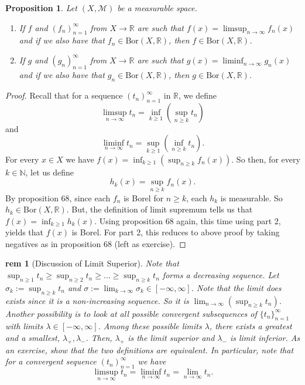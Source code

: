 \documentclass[letterpaper, 12pt]{article}
\newcommand{\fin}{\qquad \quad \hfill \framebox[1.75mm][l]{\,}}
\newcommand{\cM}{\mathcal{M}}
\newcommand{\bR}{\mathbb{R}}
\newcommand{\bN}{\mathbb{N}}
\theoremstyle{stdthm}
\newtheorem{prop}[thm]{Proposition}
\theoremstyle{stddef}
\newtheorem{rem}[thm]{rem} %
\theoremstyle{stdnonum}
\theoremstyle{stdqands}
\theoremstyle{stdbold}
\begin{document}
\begin{prop}
Let $(X,\cM)$ be a measurable space. 
\begin{enumerate}
\item If $f$ and $(f_n)_{n=1}^\infty$ from $X\to \bR$ are such that $f(x) = \limsup_{n\rightarrow \infty} f_n(x)$ and if we also have that $f_n \in \mathrm{Bor}(X,\bR)$, then $f\in\mathrm{Bor}(X,\bR)$. 
\item If $g$ and $(g_n)_{n=1}^\infty$ from $X \to \bR$ are such that $g(x) = \liminf_{n\rightarrow \infty} g_n(x)$ and if we also have that $g_n \in \mathrm{Bor}(X,\bR)$, then $g \in \mathrm{Bor}(X,\bR)$. 
\end{enumerate}
\end{prop}

\begin{proof}
Recall that for a sequence $(t_n)_{n=1}^\infty$ in $\bR$, we define 
\[
\limsup_{n\to \infty} t_n = \inf_{k\geq 1}\left(\sup_{n \geq k} t_n\right)
\]
and 
\[
\liminf_{n\rightarrow \infty}  t_n = \sup_{k\geq 1} \left(\inf_{n\geq k} t_n\right).
\]
For every $x \in X$ we have $f(x) = \inf_{k\geq 1}(\sup_{n\geq k} f_n(x))$. So then, for every $k \in \bN$, let us define 
\[
h_k(x) = \sup_{n\geq k} f_n(x).
\]
By proposition 68, since each $f_n$ is Borel for $n\geq k$, each $h_k$ is measurable. So $h_k \in \mathrm{Bor}(X,\bR)$. But, the definition of limit supremum tells us that $f(x) = \inf_{k\geq 1} h_k(x)$. Using proposition 68 again, this time using part 2, yields that $f(x)$ is Borel. For part 2, this reduces to above proof by taking negatives as in proposition 68 (left as exercise). 
\end{proof}

\begin{rem} [Discussion of Limit Superior]
Note that $\sup_{n\geq 1} t_n \geq \sup_{n\geq 2} t_n \geq \dots \geq \sup_{n\geq k} t_n$ forms a decreasing sequence. Let $\sigma_k := \sup_{n\geq k} t_n$ and $\sigma := \lim_{k\rightarrow \infty} \sigma_k \in [-\infty, \infty]$. Note that the limit does exists since it is a non-increasing sequence. So it is $\lim_{n\rightarrow \infty} (\sup_{n\geq k} t_n)$. Another possibility is to look at all possible convergent subsequences of $\{t_n\}_{n=1}^\infty$ with limits $\lambda \in [-\infty, \infty]$. Among these possible limits $\lambda$, there exists a greatest and a smallest, $\lambda_+, \lambda_-$.   Then, $\lambda_+$ is the limit superior and $\lambda_-$ is limit inferior. As an exercise, show that the two definitions are equivalent. In particular, note that for a convergent sequence $(t_n)_{n=1}^\infty$ we have 
\[
\limsup_{n\rightarrow \infty} t_n = \liminf_{n\rightarrow \infty} t_n = \lim_{n\rightarrow \infty} t_n.
\]
\end{rem}
\end{document}

